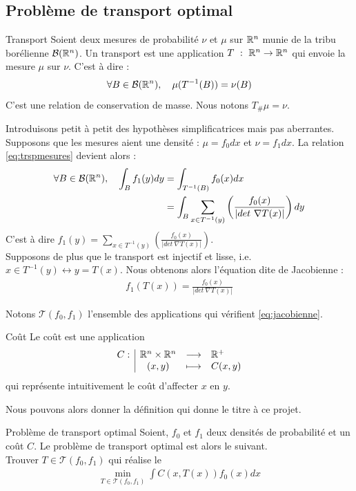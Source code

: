 \documentclass[a4paper,12pt]{article}
\begin{document}
\subsection{Problème de transport optimal}
\begin{definition}{Transport}
Soient deux mesures de probabilité $\nu$ et $\mu$ sur $\mathbb{R}^n$ munie de la tribu borélienne $\mathcal{B}(\mathbb{R}^n)$. Un transport est une application $T\ :\ \RR^n\rightarrow\RR^n$ qui envoie la mesure $\mu$ sur $\nu$. C'est à dire : 
\begin{align}
\forall B\in\mathcal{B}(\mathbb{R}^n),\quad \mu(T^{-1}(B))=\nu(B)
\label{eq:trspmesures}
\end{align}
C'est une relation de conservation de masse. Nous notons $T_{\#}\mu=\nu$. 
\end{definition}
Introduisons petit à petit des hypothèses simplificatrices mais pas aberrantes. Supposons que les mesures aient une densité : $\mu = f_0 dx$ et $\nu = f_1 dx$. La relation \eqref{eq:trspmesures} devient alors : 
\begin{align*}
\forall B \in\mathcal{B}(\mathbb{R}^n),\quad \int_B f_1(y)dy&=\int_{T^{-1}(B)} f_0(x) dx \\
&= \int_B \sum_{x\in T^{-1}(y)} \left(\frac{f_0(x)}{|det\ \nabla T(x)|}\right)dy\\
\end{align*}
C'est à dire $f_1(y) = \sum_{x\in T^{-1}(y)} \left(\frac{f_0(x)}{|det\ \nabla T(x)|}\right)$.\\
Supposons de plus que le transport est injectif et lisse, i.e. $x\in T^{-1}(y) \leftrightarrow y=T(x)$. Nous obtenons alors l'équation dite de Jacobienne : 
\begin{align}
f_1(T(x)) = \frac{f_0(x)}{|det\ \nabla T(x)|}
\label{eq:jacobienne}
\end{align}

Notons $\mathcal{T}(f_0,f_1)$ l'ensemble des applications qui vérifient \eqref{eq:jacobienne}.

\begin{definition}{Coût}
Le coût est une application 
$$
\begin{array}[t]{l|ccl} C: & \mathbb{R}^n\times\mathbb{R}^n & \longrightarrow & \mathbb{R}^+ \\ & (x,y) & \longmapsto & C(x,y) \end{array}
$$
qui représente intuitivement le coût d'affecter $x$ en $y$.
\end{definition}

Nous pouvons alors donner la définition qui donne le titre à ce projet. 
\begin{definition}{Problème de transport optimal}
Soient, $f_0$ et $f_1$ deux densités de probabilité et un coût $C$. Le problème de transport optimal est alors le suivant.\\
Trouver $T\in\mathcal{T}(f_0,f_1)$ qui réalise le 
\begin{align}
\min_{T\in\mathcal{T}(f_0,f_1)} \int C(x,T(x)) f_0(x)dx
\label{eq:trspOpt}
\end{align}
\end{definition}
\end{document}
